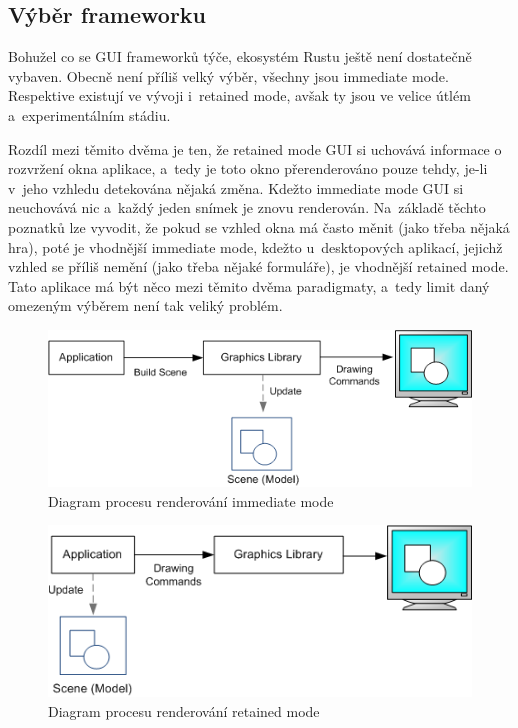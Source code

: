\documentclass[a4paper, 12pt, twoside]{article} %
\begin{document}
	\subsection{Výběr frameworku}
		Bohužel co se GUI frameworků týče, ekosystém Rustu ještě není dostatečně vybaven. Obecně není příliš velký výběr, všechny jsou immediate mode. Respektive existují ve vývoji i~retained mode, avšak ty jsou ve velice útlém a~experimentálním stádiu.

		Rozdíl mezi těmito dvěma je ten, že retained mode GUI si uchovává informace o rozvržení okna aplikace, a~tedy je toto okno přerenderováno pouze tehdy, je-li v~jeho vzhledu detekována nějaká změna. Kdežto immediate mode GUI si neuchovává nic a~každý jeden snímek je znovu renderován. Na~základě těchto poznatků lze vyvodit, že pokud se vzhled okna má často měnit (jako třeba nějaká hra), poté je vhodnější immediate mode, kdežto u~desktopových aplikací, jejichž vzhled se příliš nemění (jako třeba nějaké formuláře), je vhodnější retained mode. Tato aplikace má být něco mezi těmito dvěma paradigmaty, a~tedy limit daný omezeným výběrem není tak veliký problém.
		\begin{center}
			\begin{figure}[H]
				\centering
				\includegraphics[width=.82\linewidth]{imm_mod}
				\caption{Diagram procesu renderování immediate mode\cite{imm_mod}}
				\label{fig:imm_mod}
			\end{figure}
		\end{center}
		\begin{center}
			\begin{figure}[H]
				\centering
				\includegraphics[width=.82\linewidth]{ret_mod}
				\caption{Diagram procesu renderování retained mode\cite{ret_mod}}
				\label{fig:ret_mod}
			\end{figure}
		\end{center}
		
\end{document}
